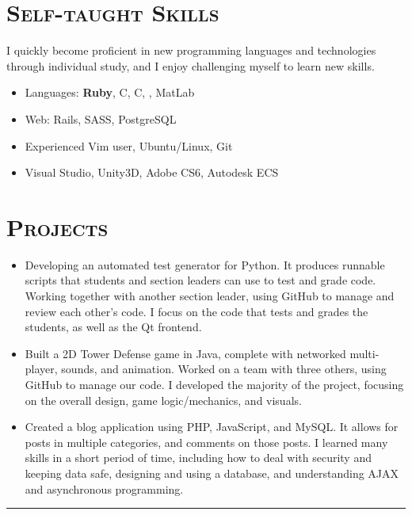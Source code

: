 \documentclass[11pt,letterpaper]{article}
\newcommand{\CPP}
{C\nolinebreak[4]\hspace{-.05em}\raisebox{.22ex}{\footnotesize\bf ++}}
\newcommand{\CS}
{C\nolinebreak[4]\hspace{-.05em}\raisebox{.22ex}{\footnotesize\bf \#}}
\newcommand{\Hsep}{\vspace{4mm} \hrule \vspace{-1mm}}
\begin{document}
\begin{minipage}{\textwidth}
\section{\scshape Self-taught Skills}
\vspace{-2mm}
I quickly become proficient in new programming languages and technologies through individual study,
and I enjoy challenging myself to learn new skills.
\vspace{3mm}
\begin{itemize}
 \item Languages: {\bfseries Ruby}, \CPP, \CS, \textls{\LaTeX}, MatLab
 \item Web: Rails, SASS, PostgreSQL
 \item Experienced Vim user, Ubuntu/Linux, Git
 \item Visual Studio, Unity3D, Adobe CS6, Autodesk ECS
\end{itemize}

\vspace{-3mm}
\section{\scshape Projects}
\vspace{-2mm}

\begin{itemize}
 \item Developing an automated test generator for Python. It produces runnable scripts that students
 and section leaders can use to test and grade code. Working together with another section leader, using GitHub to
 manage and review each other's code. I focus on the code that tests and grades the students, as well as the Qt frontend.
 
 \item Built a 2D Tower Defense game in Java, complete with networked multi-player, sounds, and animation. Worked on 
 a team with three others, using GitHub to manage our code. I developed the majority of the project, focusing on the
 overall design, game logic/mechanics, and visuals.
 \item Created a blog application using PHP, JavaScript, and MySQL. It allows for posts in
 multiple categories, and comments on those posts. I learned many skills in a short period of time, including how to deal with security
 and keeping data safe, designing and using a database, and understanding AJAX and asynchronous programming.
\end{itemize}


\Hsep


\end{minipage}
\end{document}

